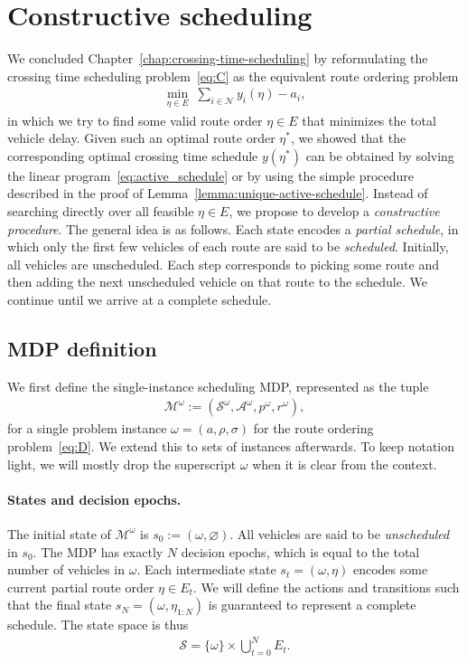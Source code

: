 \documentclass[a4paper]{report}
\theoremstyle{definition}
\theoremstyle{plain}
\begin{document}
\section{Constructive scheduling}\label{sec:MDP}
We concluded Chapter~\ref{chap:crossing-time-scheduling} by
reformulating the crossing time scheduling problem~\eqref{eq:C} as the equivalent route
ordering problem
\begin{align}
  \label{eq:D-repeat}\tag{D}
  \min_{\eta \in E} \; \sum_{i \in \mathcal{N}} y_i(\eta) - a_i ,
\end{align}
in which we try to find some valid route order $\eta \in E$ that minimizes the total
vehicle delay.
%
Given such an optimal route order $\eta^*$, we showed that the corresponding
optimal crossing time schedule $y(\eta^*)$ can be obtained by solving the linear
program~\eqref{eq:active_schedule} or by using the simple procedure described in the proof of
Lemma~\ref{lemma:unique-active-schedule}.
%
Instead of searching directly over all feasible $\eta \in E$, we propose to develop a
\emph{constructive procedure}.
The general idea is as follows.
%
Each state encodes a \emph{partial schedule}, in which only the first few
vehicles of each route are said to be \emph{scheduled}.
%
Initially, all vehicles are unscheduled.
%
Each step corresponds to picking some route and then adding the next unscheduled
vehicle on that route to the schedule.
%
We continue until we arrive at a complete schedule.


\subsection{MDP definition}

We first define the single-instance scheduling MDP, represented as the tuple
\begin{align}
  \mathcal{M}^\omega := (\mathcal{S}^\omega, \mathcal{A}^\omega, p^\omega, r^\omega) ,
\end{align}
for a single problem instance $\omega = (a, \rho, \sigma)$ for the route
ordering problem~\eqref{eq:D}.
%
We extend this to sets of instances afterwards.
%
To keep notation light, we will mostly drop the superscript $\omega$ when it is clear
from the context.

\paragraph{States and decision epochs.}
The initial state of $\mathcal{M}^\omega$ is $s_0 := (\omega, \varnothing)$. All vehicles
are said to be \emph{unscheduled} in $s_0$.
The MDP has exactly $N$ decision epochs, which is equal to the total number of
vehicles in $\omega$.
%
Each intermediate state $s_t = (\omega, \eta)$ encodes some current partial route
order $\eta \in E_t$.
%
We will define the actions and transitions such that the final state
$s_N = (\omega, \eta_{1:N})$ is guaranteed to represent a complete schedule.
%
The state space is thus
\begin{align}
  \mathcal{S} = \{\omega\} \times \bigcup_{t=0}^N E_t .
\end{align}
\end{document}
